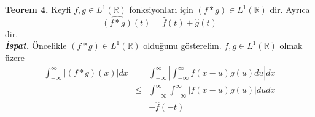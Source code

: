 \documentclass[a4paper, 9pt]{article}
\begin{document}
\textbf{Teorem 4.} Keyfi $f,g \in L^1(\mathbb{R})$ fonksiyonları için $\left( f\ast g \right) \in L^1(\mathbb{R})$ dir. Ayrıca 
$$ \widehat{\left( f\ast g \right)}(t) = \widehat{f}(t) + \widehat{g}(t)  $$
dir. \\
\textit{\textbf{İspat.}} 
Öncelikle $\left( f\ast g \right) \in L^1(\mathbb{R})$ olduğunu gösterelim. $f, g \in L^1(\mathbb{R})$ olmak üzere
	\begin{eqnarray*} 
		\int_{-\infty}^{\infty} \left| \left( f\ast g \right)(x) \right|dx &=&  \int_{-\infty}^{\infty} \left| \int_{-\infty}^{\infty} f(x-u)g(u)du \right|dx \\
		&\leq&  \int_{-\infty}^{\infty} \int_{-\infty}^{\infty} \left| f(x-u)g(u) \right| du dx \\   
		&=& -\widehat{f}(-t) 
	\end{eqnarray*}
\end{document}
